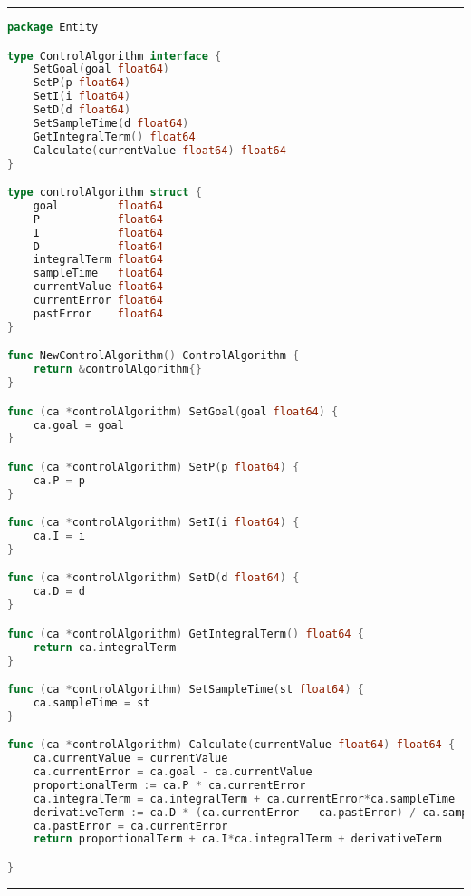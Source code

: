 
\phantom{blank}
\vspace{5mm}
\hrule
\begin{lstlisting}[language=Go,caption={ControlAlgoritm.go},breaklines=true,label={lst:ControlAlgoritm}]
package Entity

type ControlAlgorithm interface {
    SetGoal(goal float64)
    SetP(p float64)
    SetI(i float64)
    SetD(d float64)
    SetSampleTime(d float64)
    GetIntegralTerm() float64
    Calculate(currentValue float64) float64
}

type controlAlgorithm struct {
    goal         float64
    P            float64
    I            float64
    D            float64
    integralTerm float64
    sampleTime   float64
    currentValue float64
    currentError float64
    pastError    float64
}

func NewControlAlgorithm() ControlAlgorithm {
    return &controlAlgorithm{}
}

func (ca *controlAlgorithm) SetGoal(goal float64) {
    ca.goal = goal
}

func (ca *controlAlgorithm) SetP(p float64) {
    ca.P = p
}

func (ca *controlAlgorithm) SetI(i float64) {
    ca.I = i
}

func (ca *controlAlgorithm) SetD(d float64) {
    ca.D = d
}

func (ca *controlAlgorithm) GetIntegralTerm() float64 {
    return ca.integralTerm
}

func (ca *controlAlgorithm) SetSampleTime(st float64) {
    ca.sampleTime = st
}

func (ca *controlAlgorithm) Calculate(currentValue float64) float64 {
    ca.currentValue = currentValue
    ca.currentError = ca.goal - ca.currentValue
    proportionalTerm := ca.P * ca.currentError
    ca.integralTerm = ca.integralTerm + ca.currentError*ca.sampleTime
    derivativeTerm := ca.D * (ca.currentError - ca.pastError) / ca.sampleTime
    ca.pastError = ca.currentError
    return proportionalTerm + ca.I*ca.integralTerm + derivativeTerm

}

\end{lstlisting}
\hrule